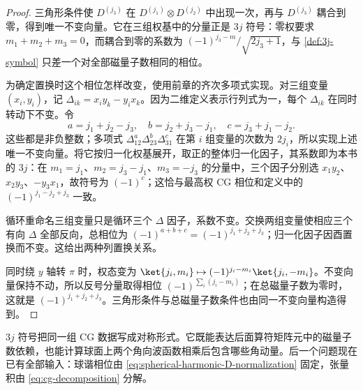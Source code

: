 \begin{proof}
三角形条件使 $D^{(j_3)}$ 在 $D^{(j_1)}\otimes D^{(j_2)}$ 中出现一次，再与 $D^{(j_3)}$ 耦合到零，得到唯一不变向量。它在三组权基中的分量正是 $3j$ 符号：零权要求 $m_1+m_2+m_3=0$，而耦合到零的系数为 $(-1)^{j_3-m}/\sqrt{2j_3+1}$，与 \cref{def:3j-symbol} 只差一个对全部磁量子数相同的相位。

为确定置换时这个相位怎样改变，使用前章的齐次多项式实现。对三组变量 $(x_i,y_i)$，记 $\Delta_{ik}=x_iy_k-y_ix_k$。因为二维定义表示行列式为一，每个 $\Delta_{ik}$ 在同时转动下不变。令
\[
a=j_1+j_2-j_3,\quad b=j_2+j_3-j_1,\quad c=j_3+j_1-j_2.
\]
这些都是非负整数；多项式 $\Delta_{12}^a\Delta_{23}^b\Delta_{31}^c$ 在第 $i$ 组变量的次数为 $2j_i$，所以实现上述唯一不变向量。将它按归一化权基展开，取正的整体归一化因子，其系数即为本书的 $3j$：在 $m_1=j_1$、$m_2=j_3-j_1$、$m_3=-j_3$ 的分量中，三个因子分别选 $x_1y_2$、$x_2y_3$、$-y_3x_1$，故符号为 $(-1)^c$；这恰与最高权 CG 相位和定义中的 $(-1)^{j_1-j_2+j_3}$ 一致。

循环重命名三组变量只是循环三个 $\Delta$ 因子，系数不变。交换两组变量使相应三个有向 $\Delta$ 全部反向，总相位为 $(-1)^{a+b+c}=(-1)^{j_1+j_2+j_3}$；归一化因子因酉置换而不变。这给出两种列置换关系。

同时绕 $y$ 轴转 $\pi$ 时，权态变为 $\ket{j_i,m_i}\mapsto(-1)^{j_i-m_i}\ket{j_i,-m_i}$。不变向量保持不动，所以反号分量取得相位 $(-1)^{\sum_i(j_i-m_i)}$；在总磁量子数为零时，这就是 $(-1)^{j_1+j_2+j_3}$。三角形条件与总磁量子数条件也由同一不变向量构造得到。
\end{proof}

$3j$ 符号把同一组 CG 数据写成对称形式。它既能表达后面算符矩阵元中的磁量子数依赖，也能计算球面上两个角向波函数相乘后包含哪些角动量。后一个问题现在已有全部输入：球谐相位由 \cref{eq:spherical-harmonic-D-normalization} 固定，张量积由 \cref{eq:cg-decomposition} 分解。

